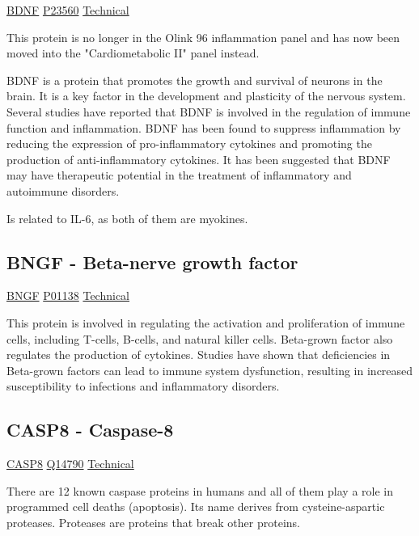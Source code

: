 \href{https://en.wikipedia.org/wiki/Brain-derived_neurotrophic_factor}{BDNF}
\href{http://www.uniprot.org/uniprot/P23560}{P23560}
\href{https://olink.com/products-services/explore/protein/?proteinID=OID30373}{Technical}

This protein is no longer in the Olink 96 inflammation panel and has now been moved into the "Cardiometabolic II" panel instead.

BDNF is a protein that promotes the growth and survival of neurons in the brain. It is a key factor in the development and plasticity of the nervous system. Several studies have reported that BDNF is involved in the regulation of immune function and inflammation. BDNF has been found to suppress inflammation by reducing the expression of pro-inflammatory cytokines and promoting the production of anti-inflammatory cytokines. It has been suggested that BDNF may have therapeutic potential in the treatment of inflammatory and autoimmune disorders.

Is related to IL-6, as both of them are myokines.

\subsection{BNGF - Beta-nerve growth factor}

\href{https://en.wikipedia.org/wiki/Nerve_growth_factor}{BNGF}
\href{http://www.uniprot.org/uniprot/P01138}{P01138}
\href{https://olink.com/products-services/target/protein/?assayID=5058}{Technical}

This protein is involved in regulating the activation and proliferation of immune cells, including T-cells, B-cells, and natural killer cells. Beta-grown factor also regulates the production of cytokines. Studies have shown that deficiencies in Beta-grown factors can lead to immune system dysfunction, resulting in increased susceptibility to infections and inflammatory disorders.

\subsection{CASP8 - Caspase-8}
\label{in:olink-casp8}

\href{https://en.wikipedia.org/wiki/Caspase\_8}{CASP8}
\href{http://www.uniprot.org/uniprot/Q14790}{Q14790}
\href{https://olink.com/products-services/target/protein/?assayID=5122}{Technical}

There are 12 known caspase proteins in humans and all of them play a role in programmed cell deaths (apoptosis). Its name derives from cysteine-aspartic proteases. Proteases are proteins that break other proteins.


